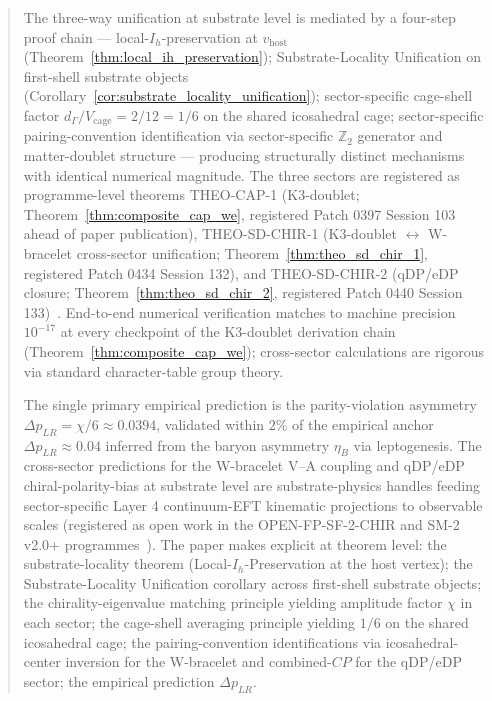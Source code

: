 \documentclass[11pt,letterpaper]{article}
\newcommand{\DeltapLR}{\Delta p_{LR}}
\begin{document}
\begin{abstract}
The three-way unification at substrate level is mediated by a four-step proof chain --- local-$I_h$-preservation at $v_{\text{host}}$ (Theorem~\ref{thm:local_ih_preservation}); Substrate-Locality Unification on first-shell substrate objects (Corollary~\ref{cor:substrate_locality_unification}); sector-specific cage-shell factor $d_\Gamma/V_{\text{cage}} = 2/12 = 1/6$ on the shared icosahedral cage; sector-specific pairing-convention identification via sector-specific $\mathbb{Z}_2$ generator and matter-doublet structure --- producing structurally distinct mechanisms with identical numerical magnitude. The three sectors are registered as programme-level theorems THEO-CAP-1 (K3-doublet; Theorem~\ref{thm:composite_cap_we}, registered Patch 0397 Session 103 ahead of paper publication), THEO-SD-CHIR-1 (K3-doublet $\leftrightarrow$ W-bracelet cross-sector unification; Theorem~\ref{thm:theo_sd_chir_1}, registered Patch 0434 Session 132), and THEO-SD-CHIR-2 (qDP/eDP closure; Theorem~\ref{thm:theo_sd_chir_2}, registered Patch 0440 Session 133)~\cite{abshier_theorem_registry}. End-to-end numerical verification matches to machine precision $10^{-17}$ at every checkpoint of the K3-doublet derivation chain (Theorem~\ref{thm:composite_cap_we}); cross-sector calculations are rigorous via standard character-table group theory.

The single primary empirical prediction is the parity-violation asymmetry $\DeltapLR = \chi/6 \approx 0.0394$, validated within $2\%$ of the empirical anchor $\DeltapLR \approx 0.04$ inferred from the baryon asymmetry $\eta_B$ via leptogenesis. The cross-sector predictions for the W-bracelet V--A coupling and qDP/eDP chiral-polarity-bias at substrate level are substrate-physics handles feeding sector-specific Layer 4 continuum-EFT kinematic projections to observable scales (registered as open work in the OPEN-FP-SF-2-CHIR and SM-2 v2.0+ programmes~\cite{abshier_research_frontier}). The paper makes explicit at theorem level: the substrate-locality theorem (Local-$I_h$-Preservation at the host vertex); the Substrate-Locality Unification corollary across first-shell substrate objects; the chirality-eigenvalue matching principle yielding amplitude factor $\chi$ in each sector; the cage-shell averaging principle yielding $1/6$ on the shared icosahedral cage; the pairing-convention identifications via icosahedral-center inversion for the W-bracelet and combined-$CP$ for the qDP/eDP sector; the empirical prediction $\DeltapLR$.


\end{abstract}
\end{document}
